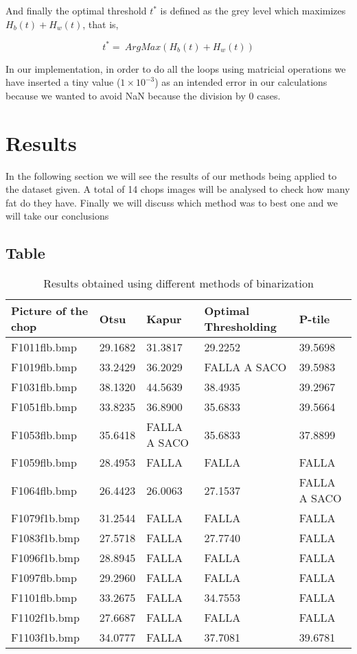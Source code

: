 \documentclass[12]{article}
\begin{document}
And finally the optimal threshold $t^{*}$ is defined as the grey level which maximizes $H_b(t)+H_w(t)$, that is, 
\vspace{-0.5cm}
\begin{center}
$$t^{*}=\ ArgMax\left(H_b(t) + H_w(t)\right)$$
\end{center}

In our implementation, in order to do all the loops using matricial operations we have inserted a tiny value ($1\times 10^{-3}$) as an intended error in our calculations because we wanted to avoid NaN because the division by 0 cases. 
\section{Results}
In the following section we will see the results of our methods being applied to the dataset given. A total of 14 chops images will be analysed to check how many fat do they have.  
Finally we will discuss which method was to best one and we will take our conclusions %
\subsection{Table}
\begin{table}[H]
\centering
\begin{tabular}{|l|l|l|l|l|}
\hline	
Picture of the chop & \textbf{Otsu} & \textbf{Kapur} & \textbf{Optimal Thresholding} & \textbf{P-tile} \\  \hline
 F1011flb.bmp & 29.1682  & 31.3817 & 29.2252  & 39.5698  \\ \hline
  F1019flb.bmp & 33.2429 & 36.2029 & FALLA A SACO & 39.5983 \\  \hline
  F1031flb.bmp & 38.1320 & 44.5639 & 38.4935 & 39.2967  \\ \hline
  F1051flb.bmp & 33.8235 & 36.8900 & 35.6833 & 39.5664\\ \hline
F1053flb.bmp & 35.6418 & FALLA A SACO & 35.6833 & 37.8899\\ \hline
F1059flb.bmp & 28.4953 & FALLA & FALLA & FALLA \\ \hline
F1064flb.bmp & 26.4423 & 26.0063 & 27.1537 & FALLA A SACO\\ \hline
F1079f1b.bmp & 31.2544 & FALLA &  FALLA & FALLA \\ \hline
F1083f1b.bmp & 27.5718 & FALLA & 27.7740  & FALLA \\ \hline
F1096f1b.bmp & 28.8945 & FALLA & FALLA & FALLA \\ \hline
F1097flb.bmp & 29.2960 & FALLA & FALLA & FALLA \\ \hline
F1101flb.bmp & 33.2675 & FALLA & 34.7553 & FALLA \\ \hline
F1102f1b.bmp & 27.6687 &FALLA &FALLA	 & FALLA \\ \hline
F1103f1b.bmp  & 34.0777 & FALLA & 37.7081 & 39.6781\\ \hline
\end{tabular}
\caption{Results obtained using different methods of binarization}
\label{Results}
\end{table}
\end{document}
